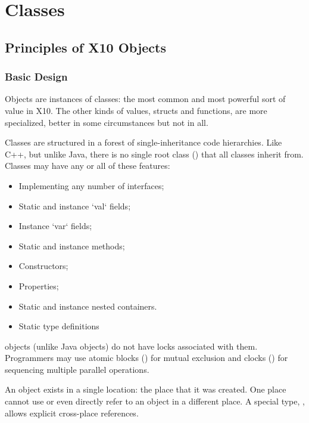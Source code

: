 

\chapter{Classes}
\label{XtenClasses}
\label{ReferenceClasses}





\section{Principles of X10 Objects}\label{XtenObjects}

\subsection{Basic Design}

Objects are instances of classes: the most common and most powerful sort of
value in X10.  The other kinds of values, structs and functions, are more
specialized, better in some circumstances but not in all.

Classes are structured in a forest of single-inheritance code
hierarchies. Like C++, but unlike Java, there is no single root
class () that all classes inherit from.  Classes
may have any or all of these features: 
\begin{itemize}
\item Implementing any number of interfaces;
\item Static and instance \xcd`val` fields; 
\item Instance \xcd`var` fields; 
\item Static and instance methods;
\item Constructors;
\item Properties;
\item Static and instance nested containers.
\item Static type definitions
\end{itemize}


\Xten{} objects (unlike Java objects) do not have locks associated with them.
Programmers may use atomic blocks () for mutual
exclusion and clocks () for sequencing multiple parallel
operations.

An object exists in a single location: the place that it was created.  One
place cannot use or even directly refer to an object in a different place.   A
special type, , allows explicit cross-place references. 

